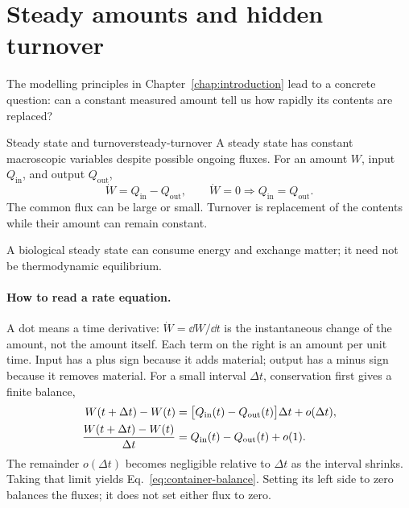 \section{Steady amounts and hidden turnover}\label{sec:why-model}
The modelling principles in Chapter~\ref{chap:introduction} lead to a concrete question: can a constant measured amount tell us how rapidly its contents are replaced?

\begin{definition}{Steady state and turnover}{steady-turnover}
A steady state has constant macroscopic variables despite possible ongoing fluxes. For an amount $W$, input $Q_{\mathrm{in}}$, and output $Q_{\mathrm{out}}$,
\begin{equation}\label{eq:container-balance}
\dot W=Q_{\mathrm{in}}-Q_{\mathrm{out}},\qquad
\dot W=0\Rightarrow Q_{\mathrm{in}}=Q_{\mathrm{out}}.
\end{equation}
The common flux can be large or small. Turnover is replacement of the contents while their amount can remain constant.
\end{definition}
A biological steady state can consume energy and exchange matter; it need not be thermodynamic equilibrium.

\paragraph{How to read a rate equation.}
A dot means a time derivative: $\dot W=\dd W/\dd t$ is the instantaneous change of the amount, not the amount itself. Each term on the right is an amount per unit time. Input has a plus sign because it adds material; output has a minus sign because it removes material. For a small interval $\Delta t$, conservation first gives a finite balance,
\begin{align}
W(t+\Delta t)-W(t)&=\bigl[Q_{\mathrm{in}}(t)-Q_{\mathrm{out}}(t)\bigr]\Delta t+o(\Delta t),\notag\\
\frac{W(t+\Delta t)-W(t)}{\Delta t}&=Q_{\mathrm{in}}(t)-Q_{\mathrm{out}}(t)+o(1).\label{eq:container-finite-balance}
\end{align}
The remainder $o(\Delta t)$ becomes negligible relative to $\Delta t$ as the interval shrinks. Taking that limit yields Eq.~\eqref{eq:container-balance}. Setting its left side to zero balances the fluxes; it does not set either flux to zero.

